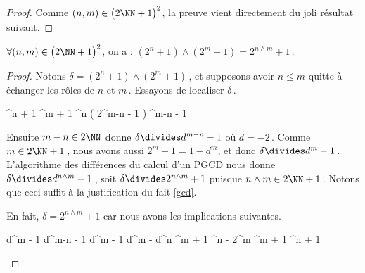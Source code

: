 \begin{proof}
	Comme $(n , m) \in \big( 2 \NN + 1 \big)^2$, la preuve vient directement du joli résultat suivant.
\end{proof}




\begin{fact}
	$\forall (n , m) \in \big( 2 \NN + 1 \big)^2$, on a :
	$(2^n + 1) \wedge (2^m + 1) = 2^{n \wedge m} + 1$\,.
\end{fact}

\begin{proof}
	Notons $\delta = (2^n + 1) \wedge (2^m + 1)$\,, et supposons avoir $n \leq m$ quitte à échanger les rôles de $n$ et $m$\,.
	Essayons de localiser $\delta$\,.
		
	\medskip
	\begin{stepcalc}[style = ar*, ope = \implies]
		\delta {}^n + 1  \delta {}^m + 1
		\delta {}^n \big( 2^{m-n} - 1 \big)
		\delta {}^{m-n} - 1
	\end{stepcalc}
	
	\medskip
	
	Ensuite $m - n \in 2 \NN$ donne $\delta \divides d^{m-n} - 1$ où $d = -2$\,.
	Comme $m \in 2 \NN + 1$\,, nous avons aussi $2^m + 1 = 1 - d^m$, et donc $\delta \divides d^m - 1$\,. 
	L'algorithme des différences du calcul d'un PGCD nous donne $\delta \divides d^{n \wedge m} - 1$\,, soit $\delta \divides 2^{n \wedge m} + 1$ puisque $n \wedge m \in 2 \NN + 1$\,.
	Notons que ceci suffit à la justification du fait \ref{gcd}.
	
	\medskip
	
	En fait, $\delta = 2^{n \wedge m} + 1$ car nous avons les implications suivantes.
		
	\medskip
	\begin{stepcalc}[style = ar*, ope = \implies]
		\delta \divides d^m - 1  \delta \divides d^{m-n} - 1
	\explnext{}
		\delta \divides d^m - 1  \delta \divides d^m - d^n
		\delta {}^m + 1  \delta {}^n - 2^m
		\delta {}^m + 1  \delta {}^n + 1
	\end{stepcalc}
\end{proof}




